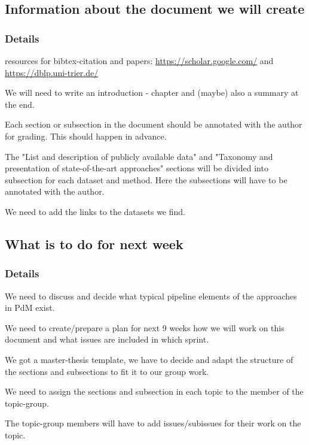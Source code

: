 \documentclass[11pt]{meetingmins} %
\begin{document}
\subsection{Information about the document we will create}
\subsubsection{Details}
\begin{hiddensubitems}
	\item resources for bibtex-citation and papers: \href{https://scholar.google.com/}{https://scholar.google.com/} and \href{https://dblp.uni-trier.de/}{https://dblp.uni-trier.de/}
	\item 
	We will need to write an introduction - chapter and (maybe) also a summary at the end.
	\item
	Each section or subsection in the document should be annotated with the author for grading. This should happen in advance.
	\item 
	The "List and description of publicly available data" and "Taxonomy and presentation of state-of-the-art approaches" sections will be divided into subsection for each dataset and method. Here the subsections will have to be annotated with the author.
	\item We need to add the links to the datasets we find.
\end{hiddensubitems}


\subsection{What is to do for next week}
    \subsubsection{Details}
        \begin{hiddensubitems}
            \item
            	We need to discuss and decide what typical pipeline elements of the approaches in PdM exist.
            \item 
            	We need to create/prepare a plan for next 9 weeks how we will work on this document and what issues are included in which sprint.
            \item
            	We got a master-thesis template, we have to decide and adapt the structure of the sections and subsections to fit it to our group work.
            \item 
            	We need to assign the sections and subsection in each topic to the member of the topic-group.
           	\item
           		The topic-group members will have to add issues/subissues for their work on the topic.
        \end{hiddensubitems}
    
\end{document}

